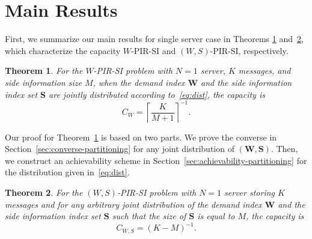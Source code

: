 \documentclass[letterpaper, 10 pt, conference]{ieeeconf}
\newcommand\alexn[1]{\notee[alex]{#1}}
\newtheorem{theorem}{Theorem}
\begin{document}

\section{Main Results}
First, we summarize our main results for single server case in Theorems \ref{thm:single-server-PIR} and~\ref{thm:single-server-PIR2}, which characterize the capacity  $W$-PIR-SI and   $(W,S)$-PIR-SI, respectively. 
\begin{theorem}
\label{thm:single-server-PIR}
For the $W$-PIR-SI problem with $N=1$ server, $K$ messages, and side information size $M$, when the demand index $\mathbf{W}$ and the side information index set $\mathbf{S}$ are jointly distributed according to~\eqref{eq:dist}, %
the capacity is
\begin{equation}
\label{eq:capacity-partition}
C_{W} = \left\lceil \frac{K}{M+1}\right\rceil^{-1}.
\end{equation}
\end{theorem}


Our proof for Theorem~\ref{thm:single-server-PIR} is based on two parts. We prove the converse in Section~\ref{sec:converse-partitioning} for any joint  distribution of $(\mathbf{W,S})$. Then, we construct an achievability scheme in Section~\ref{sec:achievability-partitioning} for the distribution given in~\eqref{eq:dist}. %


\begin{theorem}
\label{thm:single-server-PIR2}
For the $(W,S)$-PIR-SI problem with $N=1$ server storing $K$ messages %
and for any arbitrary joint distribution of the demand index $\mathbf{W}$ and the side information index set $\mathbf{S}$ such that the size of $\mathbf{S}$ is equal to $M$, the capacity is 
\begin{equation}
\label{eq:capacity-mds}
C_{W,S} = (K-M)^{-1}.
\end{equation}
\end{theorem}
\end{document}
